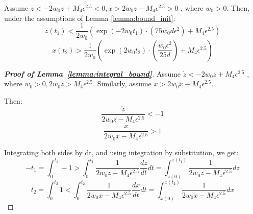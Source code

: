 \begin{lemma}\label{lemma:integral_bound}
Assume $\dot{z}< -2w_0 z +M_4 \epsilon^{2.5} <0, \dot{x}> 2w_0 z -M_4 \epsilon^{2.5} >0$ , where $w_0>0$. 
Then, under the assumptions of Lemma \ref{lemma:bound_init}:
\begin{equation}
    z(t_1)  < \frac{1}{2w_0}\left(\exp(-2w_0t_1) \cdot (75 w_0 d \epsilon^2) + M_4 \epsilon^{2.5} \right)
\end{equation}
\begin{equation}
    x(t_2)  > \frac{1}{2w_0}\left(\exp(2w_0t_2) \cdot (\frac{w_0\epsilon^2}{25d}) + M_4 \epsilon^{2.5} \right)
\end{equation}
\end{lemma}

\begin{proof}[\textbf{Proof of Lemma~\ref{lemma:integral_bound}}]
%
Assume $\dot{z}< -2w_0 z +M_4 \epsilon^{2.5}$ , where $w_0>0, 2w_0z>M_4 \epsilon^{2.5}$.
Similarly, assume $\dot{x}> 2w_0 x -M_4 \epsilon^{2.5}$.

Then:
\begin{equation}
    \frac{\dot{z}}{2w_0 z -M_4 \epsilon^{2.5}}< -1
\end{equation}
\begin{equation}
    \frac{\dot{x}}{2w_0 x -M_4 \epsilon^{2.5}}>1
\end{equation}

Integrating both sides by dt, and using integration by substitution, we get:
\begin{equation}
    -t_1 = \int_0^{t_1} -1 > \int_0^{t_1} \frac{1}{2w_0 z -M_4 \epsilon^{2.5}} \frac{dz}{dt} dt = \int_{z(0)}^{z(t_1)} \frac{1}{2w_0 z -M_4 \epsilon^{2.5}} dz
\end{equation}
\begin{equation}
    t_2 = \int_0^{t_2} 1 < \int_0^{t_2} \frac{1}{2w_0 x -M_4 \epsilon^{2.5}} \frac{dx}{dt} dt = \int_{x(0)}^{x(t_2)} \frac{1}{2w_0 x -M_4 \epsilon^{2.5}} dx
\end{equation}


\end{proof}
